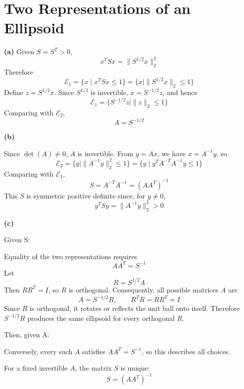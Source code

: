 \section{Two Representations of an Ellipsoid}


\textbf{(a)}
Given \(S=S^T>0\),
\[
x^TSx=\|S^{1/2}x\|_2^2
\]
Therefore
\[
\mathcal{E}_1
=\{x\mid x^TSx\leq1\}
=\{x\mid\|S^{1/2}x\|_2\leq1\}
\]
Define \(z=S^{1/2}x\). Since \(S^{1/2}\) is invertible,
\(x=S^{-1/2}z\), and hence
\[
\mathcal{E}_1=\{S^{-1/2}z\mid\|z\|_2\leq1\}
\]
Comparing with \(\mathcal{E}_2\),
\[
\boxed{A=S^{-1/2}}
\]

\textbf{(b)}

Since \(\det(A)\neq 0\), \(A\) is invertible. From \(y=Ax\), we have
\(x=A^{-1}y\), so
\[
\mathcal{E}_2
=\{y\mid \|A^{-1}y\|_2^2\leq1\}
=\{y\mid y^TA^{-T}A^{-1}y\leq1\}
\]
Comparing with \(\mathcal{E}_1\),
\[
\boxed{S=A^{-T}A^{-1}=(AA^T)^{-1}}
\]
This \(S\) is symmetric positive definite since, for \(y\neq0\),
\[
y^TSy=\|A^{-1}y\|_2^2>0
\]

\textbf{(c)}

Given S:

Equality of the two representations requires
\[
AA^T=S^{-1}
\]
Let
\[
R=S^{1/2}A
\]
Then \(RR^T=I\), so \(R\) is orthogonal. Consequently, all possible matrices
\(A\) are
\[
\boxed{A=S^{-1/2}R,\qquad R^TR=RR^T=I}
\]
Since \(R\) is orthogonal, it rotates or reflects the unit ball onto itself.
Therefore \(S^{-1/2}R\) produces the same ellipsoid for every orthogonal \(R\).

Then, given A:

Conversely, every such \(A\) satisfies \(AA^T=S^{-1}\), so this describes all
choices.

For a fixed invertible \(A\), the matrix \(S\) is unique:
\[
\boxed{S=(AA^T)^{-1}}
\]
